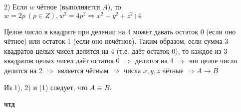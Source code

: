 \documentclass[a4paper,16pt]{article}
\begin{document}
	2) Если $w$ чётное (выполняется $A$), то $ w = 2p \ (p \in Z), w^2 = 4p^2 \Rightarrow x^2+y^2+z^2 \ \vdots \ 4$
	
	Целое число в квадрате при делении на 4 может давать остаток 0 (если оно чётное) или остаток 1 (если оно нечётное). Таким образом, если сумма 3 квадратов целых чисел делится на 4 (т.е. даёт остаток 0), то каждое из 3 квадратов целых чисел даёт остаток 0 $\Rightarrow$ делится на 4 $\Rightarrow$ это целое число делится на 2 $\Rightarrow$ является чётным $\Rightarrow$ числа $x, y, z$ чётные $\Rightarrow A \to B  $
	
	Из 1), 2) и (1) следует, что $A \equiv B$.
	
	\begin{flushright}
		\textbf{чтд}
	\end{flushright}
	
	
\end{document}
